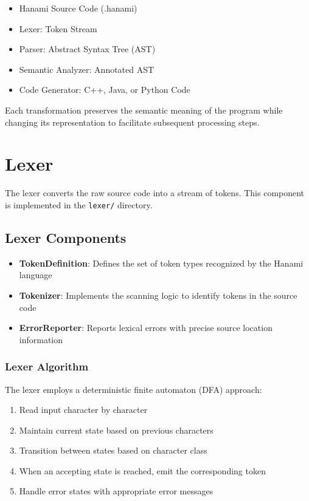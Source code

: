 \documentclass[12pt,a4paper]{article}
\begin{document}
\begin{itemize}
    \item Hanami Source Code (.hanami)
    \item Lexer: Token Stream
    \item Parser: Abstract Syntax Tree (AST)
    \item Semantic Analyzer: Annotated AST
    \item Code Generator: C++, Java, or Python Code
\end{itemize}

Each transformation preserves the semantic meaning of the program while changing its representation to facilitate subsequent processing steps.

\section{Lexer}

The lexer converts the raw source code into a stream of tokens. This component is implemented in the \texttt{lexer/} directory.

\subsection{Lexer Components}

\begin{itemize}
    \item \textbf{TokenDefinition}: Defines the set of token types recognized by the Hanami language
    \item \textbf{Tokenizer}: Implements the scanning logic to identify tokens in the source code
    \item \textbf{ErrorReporter}: Reports lexical errors with precise source location information
\end{itemize}

\subsubsection{Lexer Algorithm}

The lexer employs a deterministic finite automaton (DFA) approach:

\begin{enumerate}
    \item Read input character by character
    \item Maintain current state based on previous characters
    \item Transition between states based on character class
    \item When an accepting state is reached, emit the corresponding token
    \item Handle error states with appropriate error messages
\end{enumerate}
\end{document}
